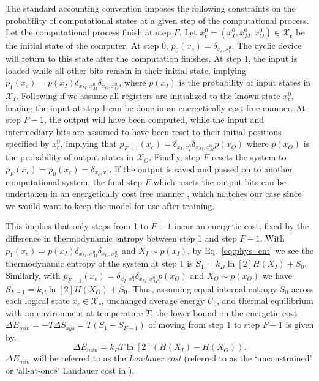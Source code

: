 \documentclass[12pt,onecolumn, margin=1in]{IEEEtran}
\begin{document}
The standard accounting convention imposes the following constraints on the probability of computational states at a given step of the computational process. Let the computational process finish at step $F$. Let $x_c^0 =(x_I^0, x_M^0, x_O^0) \in \mathcal{X}_c$ be the initial state of the computer. At step $0$, $p_0(x_c) = \delta_{x_c,x_c^0}$. The cyclic device will return to this state after the computation finishes. At step $1$, the input is loaded while all other bits remain in their initial state, implying $p_1(x_c) = p(x_I) \delta_{x_M,x_M^0} \delta_{x_O,x_O^0}$, where $p(x_I)$ is the probability of input states in $\mathcal{X}_I$. Following \cite[p. 34]{Wolpert2019} if we assume all registers are initialized to the known state $x_c^0$, loading the input at step 1 can be done in an energetically cost free manner. At step $F-1$, the output will have been computed, while the input and intermediary bits are assumed to have been reset to their initial positions specified by $x_c^0$, implying that $p_{F-1}(x_c) = \delta_{x_I,x_I^0} \delta_{x_M,x_M^0} p(x_O)$ where $p(x_O)$ is the probability of output states in $\mathcal{X}_O$. Finally, step $F$ resets the system to $p_F(x_c) = p_0(x_c) = \delta_{x_c,x_c^0}$. If the output is saved and passed on to another computational system, the final step $F$ which resets the output bits can be undertaken in an energetically cost free manner \cite[p. 34]{Wolpert2019}, which matches our case since we would want to keep the model for use after training. 

This implies that only steps from 1 to $F-1$ incur an energetic cost, fixed by the difference in thermodynamic entropy between step 1 and step $F-1$. With $p_1(x_c) = p(x_I) \delta_{x_M,x_M^0} \delta_{x_O,x_O^0}$ and $X_I \sim p(x_I)$, by Eq.~\eqref{eq:phys_ent} we see the thermodynamic entropy of the system at step 1 is $S_{1} = k_B \ln[2] H(X_I) + S_0$. Similarly, with $p_{F-1}(x_c) = \delta_{x_I,x_I^0} \delta_{x_M,x_M^0} p(x_O)$ and $X_O \sim p(x_O)$ we have $S_{F-1} = k_B \ln[2]H(X_O) + S_0$. Thus, assuming equal internal entropy $S_0$ across each logical state $x_c \in \mathcal{X}_c$, unchanged average energy $U_0$, and thermal equilibrium with an environment at temperature $T$, the lower bound on the energetic cost $\Delta E_{min} = -T\Delta S_{sys} = T(S_{1} - S_{F-1})$ of moving from step 1 to step $F-1$ is given by,
\begin{equation}
    \label{eq:Landauer}
    \Delta E_{min} = k_BT \ln[2] (H(X_I)
 - H(X_O)).
\end{equation}
$\Delta E_{min}$ will be referred to as the \textit{Landauer cost} (referred to as the `unconstrained' or `all-at-once' Landauer cost in \cite{Wolpert2019}). 
\end{document}
